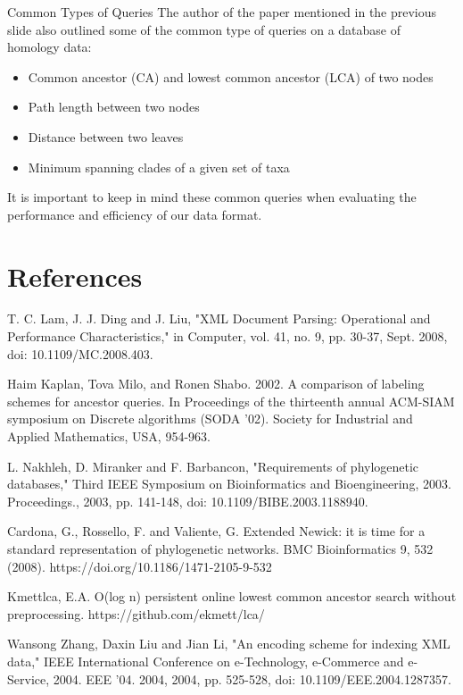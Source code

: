 \documentclass{beamer}
\begin{document}
\begin{frame}{Common Types of Queries}
    The author of the paper mentioned in the previous slide also outlined some of the common type of queries on a database of homology data:
    \begin{itemize}
        \item Common ancestor (CA) and lowest common ancestor (LCA) of two nodes
        \item Path length between two nodes
        \item Distance between two leaves
        \item Minimum spanning clades of a given set of taxa
    \end{itemize}
    It is important to keep in mind these common queries when evaluating the performance and efficiency of our data format.
\end{frame}

\section{References}

\begin{frame}
    \scriptsize

    T. C. Lam, J. J. Ding and J. Liu, "XML Document Parsing: Operational and Performance Characteristics," in Computer, vol. 41, no. 9, pp. 30-37, Sept. 2008, doi: 10.1109/MC.2008.403.

    Haim Kaplan, Tova Milo, and Ronen Shabo. 2002. A comparison of labeling schemes for ancestor queries. In Proceedings of the thirteenth annual ACM-SIAM symposium on Discrete algorithms (SODA '02). Society for Industrial and Applied Mathematics, USA, 954-963.

    L. Nakhleh, D. Miranker and F. Barbancon, "Requirements of phylogenetic databases," Third IEEE Symposium on Bioinformatics and Bioengineering, 2003. Proceedings., 2003, pp. 141-148, doi: 10.1109/BIBE.2003.1188940.

    Cardona, G., Rossello, F. and Valiente, G. Extended Newick: it is time for a standard representation of phylogenetic networks. BMC Bioinformatics 9, 532 (2008). https://doi.org/10.1186/1471-2105-9-532

    Kmettlca, E.A. O(log n) persistent online lowest common ancestor search without preprocessing. https://github.com/ekmett/lca/
    
    Wansong Zhang, Daxin Liu and Jian Li, "An encoding scheme for indexing XML data," IEEE International Conference on e-Technology, e-Commerce and e-Service, 2004. EEE '04. 2004, 2004, pp. 525-528, doi: 10.1109/EEE.2004.1287357.
\end{frame}
\end{document}
